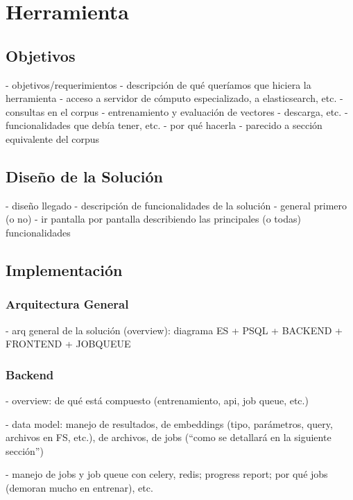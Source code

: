 \chapter{Herramienta}

\section{Objetivos}

- objetivos/requerimientos
    - descripción de qué queríamos que hiciera la herramienta
        - acceso a servidor de cómputo especializado, a elasticsearch, etc.
        - consultas en el corpus
        - entrenamiento y evaluación de vectores
        - descarga, etc.
    - funcionalidades que debía tener, etc.
    - por qué hacerla
    - parecido a sección equivalente del corpus


\section{Diseño de la Solución}

- diseño llegado
    - descripción de funcionalidades de la solución
    - general primero (o no)
    - ir pantalla por pantalla describiendo las principales (o todas) funcionalidades


\section{Implementación}

\subsection{Arquitectura General}

- arq general de la solución (overview): diagrama ES + PSQL + BACKEND + FRONTEND + JOBQUEUE


\subsection{Backend}

- overview: de qué está compuesto (entrenamiento, api, job queue, etc.)

- data model: manejo de resultados, de embeddings (tipo, parámetros, query, archivos en FS, etc.),
              de archivos, de jobs (``como se detallará en la siguiente sección'')

- manejo de jobs y job queue con celery, redis; progress report; por qué jobs (demoran mucho en entrenar), etc.


